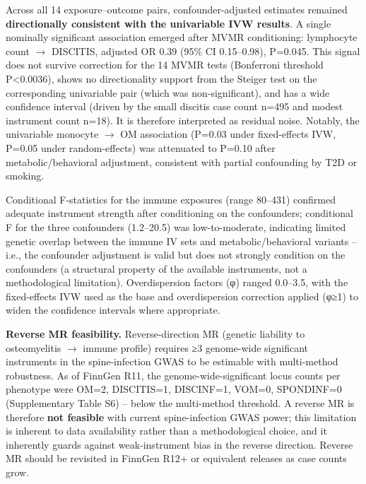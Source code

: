 \documentclass[11pt]{article}
\begin{document}
Across all 14 exposure--outcome pairs, confounder-adjusted estimates remained \textbf{directionally consistent with the univariable IVW results}. A single nominally significant association emerged after MVMR conditioning: lymphocyte count $\rightarrow$  DISCITIS, adjusted OR 0.39 (95\% CI 0.15--0.98), P=0.045. This signal does not survive correction for the 14 MVMR tests (Bonferroni threshold P<0.0036), shows no directionality support from the Steiger test on the corresponding univariable pair (which was non-significant), and has a wide confidence interval (driven by the small discitis case count n=495 and modest instrument count n=18). It is therefore interpreted as residual noise. Notably, the univariable monocyte $\rightarrow$  OM association (P=0.03 under fixed-effects IVW, P=0.05 under random-effects) was attenuated to P=0.10 after metabolic/behavioral adjustment, consistent with partial confounding by T2D or smoking.

Conditional F-statistics for the immune exposures (range 80--431) confirmed adequate instrument strength after conditioning on the confounders; conditional F for the three confounders (1.2--20.5) was low-to-moderate, indicating limited genetic overlap between the immune IV sets and metabolic/behavioral variants -- i.e., the confounder adjustment is valid but does not strongly condition on the confounders (a structural property of the available instruments, not a methodological limitation). Overdispersion factors (φ) ranged 0.0--3.5, with the fixed-effects IVW used as the base and overdispersion correction applied (φ≥1) to widen the confidence intervals where appropriate.

\textbf{Reverse MR feasibility.} Reverse-direction MR (genetic liability to osteomyelitis $\rightarrow$  immune profile) requires ≥3 genome-wide significant instruments in the spine-infection GWAS to be estimable with multi-method robustness. As of FinnGen R11, the genome-wide-significant locus counts per phenotype were OM=2, DISCITIS=1, DISCINF=1, VOM=0, SPONDINF=0 (Supplementary Table S6) -- below the multi-method threshold. A reverse MR is therefore \textbf{not feasible} with current spine-infection GWAS power; this limitation is inherent to data availability rather than a methodological choice, and it inherently guards against weak-instrument bias in the reverse direction. Reverse MR should be revisited in FinnGen R12+ or equivalent releases as case counts grow.
\end{document}
